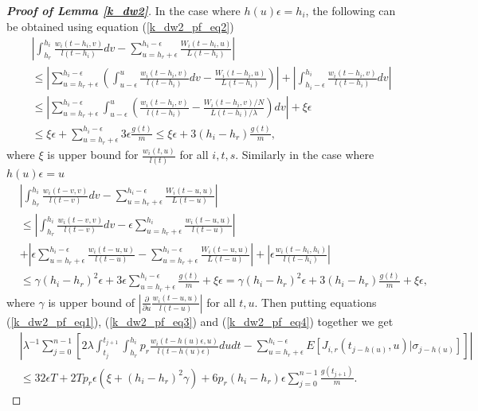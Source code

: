 \documentclass[12pt]{article}
\numberwithin{equation}{section}  %
\begin{document}
\begin{proof}[\textbf{Proof of Lemma \ref{k_dw2}}]
In the case where $h(u)\epsilon=h_i$, the following can be obtained using equation (\ref{k_dw2_pf_eq2})
\begin{align}
&\left|\int_{h_r}^{h_i}\frac{w_i(t-h_i,v)}{l(t-h_i)}dv-\sum_{u=h_r+\epsilon}^{h_i-\epsilon}\frac{ W_{i}(t-h_i,u)}{L(t-h_i)}\right|\nonumber\\
&\leq \left|
\sum_{u=h_r+\epsilon}^{h_i-\epsilon}\left(
\int_{u-\epsilon}^u \frac{w_i(t-h_i,v)}{l(t-h_i)}dv-\frac{ W_{i}(t-h_i,u)}{L(t-h_i)}
\right)
\right|
+\left| \int_{h_i-\epsilon}^{h_i}\frac{w_i(t-h_i,v)}{l(t-h_i)}dv\right|\nonumber\\
&\leq \left|
\sum_{u=h_r+\epsilon}^{h_i-\epsilon}
\int_{u-\epsilon}^u
\left(
\frac{w_i(t-h_i,v)}{l(t-h_i)}-\frac{ W_{i}(t-h_i,v)/N}{L(t-h_i)/\lambda}
\right)dv
\right|
+\xi\epsilon\nonumber\\
&\leq\xi\epsilon+\sum_{u=h_r+\epsilon}^{h_i-\epsilon}3\epsilon \frac{g(t)}{m}\leq\xi\epsilon+3(h_i-h_r)\frac{g(t)}{m}\label{k_dw2_pf_eq3},
\end{align} 
where $\xi$ is upper bound for $\frac{w_i(t,u)}{l(t)}$ for all $i,t,s$. Similarly in the case where $h(u)\epsilon=u$
{
\begin{align}
&\left|\int_{h_r}^{h_i}\frac{w_i(t-v,v)}{l(t-v)}dv-\sum_{u=h_r+\epsilon}^{h_i-\epsilon}\frac{ W_{i}(t-u,u)}{L(t-u)}\right|\nonumber\\
&\leq\left|
\int_{h_r}^{h_i}\frac{w_i(t-v,v)}{l(t-v)}dv
-\epsilon\sum_{u=h_r+\epsilon}^{h_i}\frac{w_i(t-u,u)}{l(t-u)}
\right|\nonumber\\
&+\left|
\epsilon\sum_{u=h_r+\epsilon}^{h_i-\epsilon}\frac{w_i(t-u,u)}{l(t-u)}
-\sum_{u=h_r+\epsilon}^{h_i-\epsilon}\frac{ W_{i}(t-u,u)}{L(t-u)}
\right|+\left|\epsilon\frac{w_i(t-h_i,h_i)}{l(t-h_i)}\right|\nonumber\\
&\leq\gamma(h_i-h_r)^2\epsilon+3\epsilon \sum_{u=h_r+\epsilon}^{h_i-\epsilon}\frac{g(t)}{m}+\xi\epsilon=\gamma(h_i-h_r)^2\epsilon+3(h_i-h_r)\frac{g(t)}{m}+\xi\epsilon\label{k_dw2_pf_eq4},
\end{align} }
where $\gamma$ is upper bound of $|\frac{\partial}{\partial u}\frac{w_i(t-u,u)}{l(t-u)}|$ for all $t,u$.
Then putting equations (\ref{k_dw2_pf_eq1}), (\ref{k_dw2_pf_eq3}) and (\ref{k_dw2_pf_eq4}) together we get
\begin{align*} 
&\left|
\lambda^{-1}\sum_{j=0}^{n-1}\left[
2\lambda\int_{t_j}^{t_{j+1}}\int_{h_r}^{h_i}p_r\frac{w_i(t-h(u)\epsilon,u)}{l(t-h(u)\epsilon)}dudt-\sum_{u=h_r+\epsilon}^{h_i-\epsilon}E[J_{i,r}(t_{j-h(u)},u)|\sigma_{j-h(u)}]\right]
\right|\\
&\leq32\epsilon T+2Tp_r\epsilon(\xi+(h_i-h_r)^2\gamma)+6p_r(h_i-h_r)\epsilon \sum_{j=0}^{n-1}\frac{g(t_{j+1})}{m}.
\end{align*} 
\end{proof}
\end{document}
